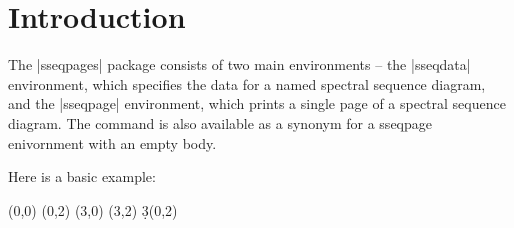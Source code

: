 \documentclass{ltxdoc}
\begin{document}
\tableofcontents
\section{Introduction}
The |sseqpages| package consists of two main environments -- the |sseqdata| environment, which specifies the data for a named spectral sequence diagram, and the |sseqpage| environment, which prints a single page of a spectral sequence diagram. The command \cmd\printpage{} is also available as a synonym for a sseqpage enivornment with an empty body.

Here is a basic example:
\begin{codeexample}[]
\begin{sseqdata}[name=ex1,cohomological Serre grading]
\class(0,0)
\class(0,2)
\class(3,0)
\class(3,2)
\d3(0,2)
\end{sseqdata}
\printpage[name=ex1,page=3]\hskip1cm
\printpage[name=ex1,page=4]
\end{codeexample}
\end{document}
